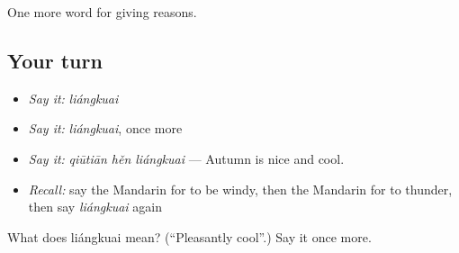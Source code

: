 \begin{grammarlens}[title={What you've built}]
One more word for giving reasons.
\end{grammarlens}

\subsection*{Your turn}
\begin{itemize}
\raggedright
  \item \emph{Say it:} \emph{liángkuai}
  \item \emph{Say it:} \emph{liángkuai}, once more
  \item \emph{Say it:} \emph{qiūtiān hěn liángkuai} — Autumn is nice and cool.
  \item \emph{Recall:} say the Mandarin for to be windy, then the Mandarin for to thunder, then say \emph{liángkuai} again
\end{itemize}

\begin{tcolorbox}[breakable,colback=teal!4,colframe=teal!35!black,title={Before you move on}]
What does liángkuai mean? (\textquotedblleft{}Pleasantly cool\textquotedblright{}.) Say it once more.
\end{tcolorbox}
